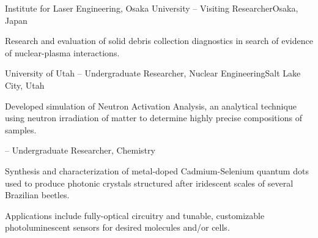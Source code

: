 \begin{rSubsection}{Institute for Laser Engineering, Osaka University}{{} -- }{Visiting Researcher}{Osaka, Japan}
\item    Research and evaluation of solid debris collection diagnostics in search of evidence of nuclear-plasma interactions.
\end{rSubsection}
% 
% 





\begin{rSubsection}{University of Utah}{ -- }{Undergraduate Researcher, Nuclear Engineering}{Salt Lake City, Utah}
\item Developed simulation of Neutron Activation Analysis, an analytical technique using neutron irradiation of matter to determine highly precise compositions of samples.
  \else \fi
{}  \else \fi
\end{rSubsection}\vspace{-1.5\baselineskip}
\begin{rSubsection}{}{ -- }{Undergraduate Researcher, Chemistry}{}
\item  Synthesis and characterization of metal-doped Cadmium-Selenium quantum dots used to produce photonic crystals structured after iridescent scales of several Brazilian beetles.
\item  Applications include fully-optical circuitry and tunable, customizable photoluminescent sensors for desired molecules and/or cells.
  \else \fi
\end{rSubsection}

